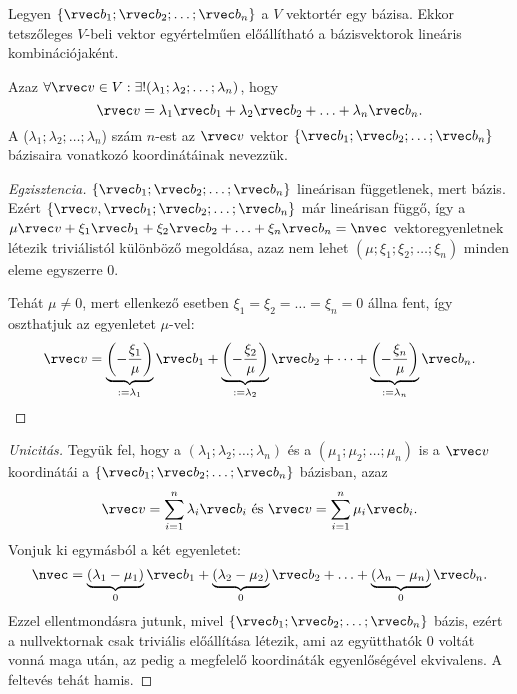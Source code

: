 \begin{statement}
  Legyen $\{ \rvec b_1; \rvec b_2; \dots; \rvec b_n \}$ a $V$ vektortér egy
  bázisa. Ekkor tetszőleges $V$-beli vektor egyértelműen előállítható a
  bázisvektorok lineáris kombinációjaként.

  Azaz $\forall \rvec v \in V: \exists! (\lambda_1; \lambda_2; \dots; \lambda_n)$,
  hogy
  $$
    \rvec v
    = \lambda_1 \rvec b_1
    + \lambda_2 \rvec b_2
    + \ldots
    + \lambda_n \rvec b_n
    \text.
  $$
  A ($\lambda_1; \lambda_2; \dots; \lambda_n$) szám $n$-est az $\rvec v$ vektor
  $\{ \rvec b_1; \rvec b_2; \dots; \rvec b_n \}$ bázisaira vonatkozó
  koordinátáinak nevezzük.

  \begin{proof}[Egzisztencia]
    $\{ \rvec b_1; \rvec b_2; \dots; \rvec b_n \}$ lineárisan
    függetlenek, mert bázis. Ezért $\{ \rvec v, \rvec b_1; \rvec b_2;
      \ldots; \rvec b_n \}$ már lineárisan függő, így a
    $
      \mu \rvec v + \xi_1 \rvec b_1 + \xi_2 \rvec b_2 + \ldots
      + \xi_n \rvec b_n = \nvec
    $
    vektoregyenletnek létezik triviálistól különböző megoldása, azaz nem
    lehet $(\mu; \xi_1; \xi_2; \ldots; \xi_n)$ minden eleme
    egyszerre 0.

    Tehát $\mu \neq 0$, mert ellenkező esetben $\xi_1 = \xi_2
      = \ldots = \xi_n = 0$ állna fent, így oszthatjuk az egyenletet
    $\mu$-vel:
    $$
      \rvec v
      = \underbrace{\left(-\frac{\xi_1}{\mu}\right)}_{:= \lambda_1} \rvec b_1
      + \underbrace{\left(-\frac{\xi_2}{\mu}\right)}_{:= \lambda_2} \rvec b_2
      + \dots
      + \underbrace{\left(-\frac{\xi_n}{\mu}\right)}_{:= \lambda_n} \rvec b_n
      \text.
    $$
  \end{proof}

  \begin{proof}[Unicitás]
    Tegyük fel, hogy a $(\lambda_1; \lambda_2; \ldots; \lambda_n)$ és a
    $(\mu_1; \mu_2; \ldots; \mu_n)$ is a $\rvec v$
    koordinátái a $\{ \rvec b_1; \rvec b_2; \ldots; \rvec b_n \}$
    bázisban, azaz
    $$
      \rvec v = \sum_{i=1}^n \lambda_i \rvec b_i
      \text{ és }
      \rvec v = \sum_{i=1}^n \mu_i \rvec b_i
      \text.
    $$
    Vonjuk ki egymásból a két egyenletet:
    $$
      \nvec
      = \underbrace{(\lambda_1 - \mu_1)}_{0} \rvec b_1
      + \underbrace{(\lambda_2 - \mu_2)}_{0} \rvec b_2
      + \ldots
      + \underbrace{(\lambda_n - \mu_n)}_{0} \rvec b_n
      \text.
    $$
    Ezzel ellentmondásra jutunk, mivel $\{ \rvec b_1; \rvec b_2;
      \ldots; \rvec b_n \}$ bázis, ezért a nullvektornak csak triviális
    előállítása létezik, ami az együtthatók 0 voltát vonná maga után,
    az pedig a megfelelő koordináták egyenlőségével ekvivalens. A
    feltevés tehát hamis.
  \end{proof}
\end{statement}